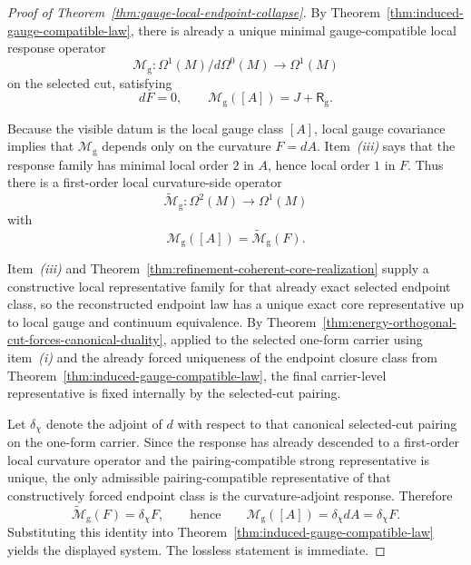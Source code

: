 \begin{proof}[Proof of Theorem~\ref{thm:gauge-local-endpoint-collapse}]
\label{proof:thm:gauge-local-endpoint-collapse}
By Theorem~\ref{thm:induced-gauge-compatible-law}, there is already a unique
minimal gauge-compatible local response operator
\[
\mathcal M_{\mathrm g}:\Omega^1(M)/d\Omega^0(M)\to\Omega^1(M)
\]
on the selected cut, satisfying
\[
dF=0,
\qquad
\mathcal M_{\mathrm g}([A])=J+\mathsf R_{\mathrm g}.
\]

Because the visible datum is the local gauge class \([A]\), local gauge
covariance implies that \(\mathcal M_{\mathrm g}\) depends only on the
curvature \(F=dA\). Item~\emph{(iii)} says that the response family has
minimal local order \(2\) in \(A\), hence local order \(1\) in \(F\). Thus
there is a first-order local curvature-side operator
\[
\widetilde{\mathcal M}_{\mathrm g}:\Omega^2(M)\to\Omega^1(M)
\]
with
\[
\mathcal M_{\mathrm g}([A])=\widetilde{\mathcal M}_{\mathrm g}(F).
\]

Item~\emph{(iii)} and
Theorem~\ref{thm:refinement-coherent-core-realization} supply a constructive
local representative family for that already exact selected endpoint class, so
the reconstructed endpoint law has a unique exact core representative up to
local gauge and continuum equivalence. By
Theorem~\ref{thm:energy-orthogonal-cut-forces-canonical-duality}, applied to
the selected one-form carrier using item~\emph{(i)} and the already forced
uniqueness of the endpoint closure class from
Theorem~\ref{thm:induced-gauge-compatible-law}, the final carrier-level
representative is fixed internally by the selected-cut pairing.

Let \(\delta_{\chi}\) denote the adjoint of \(d\) with respect to that
canonical selected-cut pairing on the one-form carrier. Since the response has
already descended to a first-order local curvature operator and the
pairing-compatible strong representative is unique, the only admissible
pairing-compatible representative of that constructively forced endpoint class is
the curvature-adjoint response. Therefore
\[
\widetilde{\mathcal M}_{\mathrm g}(F)=\delta_{\chi}F,
\qquad\text{hence}\qquad
\mathcal M_{\mathrm g}([A])=\delta_{\chi}dA=\delta_{\chi}F.
\]
Substituting this identity into
Theorem~\ref{thm:induced-gauge-compatible-law} yields the displayed system.
The lossless statement is immediate.
\end{proof}

